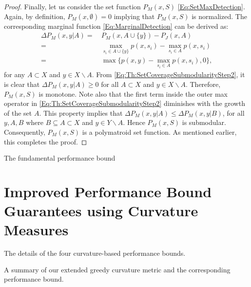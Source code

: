 \documentclass[letterpaper, 10 pt, conference]{ieeeconf}
\begin{document}
\begin{proof}
Finally, let us consider the set function $P_M(x,S)$ \eqref{Eq:SetMaxDetection}. Again, by definition, $P_M(x,\emptyset) = 0$ implying that $P_M(x,S)$ is normalized. The corresponding marginal function \eqref{Eq:MarginalDetection} can be derived as:
\begin{align}
\Delta P_M(x,y \vert A) =&\ P_M(x,A\cup\{y\}) - P_J(x,A) \nonumber\\    
=&\ \max_{s_i\in A\cup\{y\}} p(x,s_i) - \max_{s_i\in A} p(x,s_i)\nonumber\\
=&\ \max\{p(x,y)-\max_{s_i\in A} p(x,s_i),0\}, \label{Eq:Th:SetCoverageSubmodularityStep2}
\end{align}
for any $A \subset X$ and $y\in X\backslash A$. From \eqref{Eq:Th:SetCoverageSubmodularityStep2}, it is clear that $\Delta P_M(x,y \vert A) \geq 0$ for all $A \subset X$ and $y\in X\backslash A$. Therefore, $P_M(x,S)$ is monotone. Note also that the first term inside the outer max operator in \eqref{Eq:Th:SetCoverageSubmodularityStep2} diminishes with the growth of the set $A$. This property implies that $\Delta P_M(x,y \vert A) \leq \Delta P_M(x,y \vert B)$, for all $y,A,B$ where $B \subseteq A \subset X$ and $y \in Y\backslash A$. Hence $P_M(x,S)$ is submodular. Consequently, $P_M(x,S)$ is a polymatroid set function. As mentioned earlier, this completes the proof.
\end{proof}


The fundamental performance bound



\section{Improved Performance Bound Guarantees using Curvature Measures}
\label{Sec:CurvatureMeasures}

The details of the four curvature-based performance bounds. 




A summary of our extended greedy curvature metric and the corresponding performance bound. 


\end{document}
